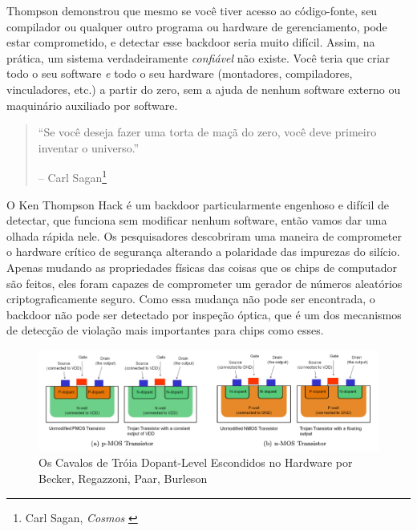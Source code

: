 Thompson demonstrou que mesmo se você tiver acesso ao código-fonte, seu compilador ou qualquer outro programa ou hardware de gerenciamento, pode estar comprometido, e detectar esse backdoor seria muito difícil. Assim, na prática, um sistema verdadeiramente \textit{confiável} não existe. Você teria que criar todo o seu software \textit{e} todo o seu hardware (montadores, compiladores, vinculadores, etc.) a partir do zero, sem a ajuda de nenhum software externo ou maquinário auxiliado por software.

\begin{quotation}\begin{samepage}
\enquote{Se você deseja fazer uma torta de maçã do zero, você deve primeiro inventar o universo.}
\begin{flushright} -- Carl Sagan\footnote{Carl Sagan, \textit{Cosmos} \cite{cosmos}}
\end{flushright}\end{samepage}\end{quotation}

O Ken Thompson Hack é um backdoor particularmente engenhoso e difícil de detectar, que funciona sem modificar nenhum software, então vamos dar uma olhada rápida nele. Os pesquisadores descobriram uma maneira de comprometer o hardware crítico de segurança alterando a polaridade das impurezas do silício.~\cite{becker2013stealthy} Apenas mudando as propriedades físicas das coisas que os chips de computador são feitos, eles foram capazes de comprometer um gerador de números aleatórios criptograficamente seguro. Como essa mudança não pode ser encontrada, o backdoor não pode ser detectado por inspeção óptica, que é um dos mecanismos de detecção de violação mais importantes para chips como esses.

\begin{figure}
  \includegraphics{assets/images/stealthy-hardware-trojan.png}
  \caption{Os Cavalos de Tróia Dopant-Level Escondidos no Hardware por Becker, Regazzoni, Paar, Burleson}
  \label{fig:stealthy-hardware-trojan}
\end{figure}

